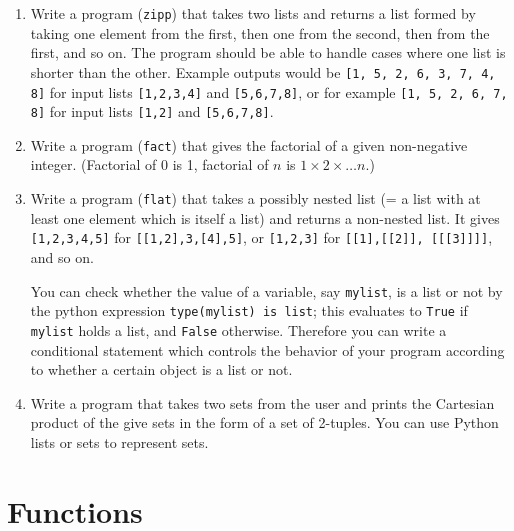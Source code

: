 \documentclass[a4paper]{article}
\begin{document}
\begin{itemize}
\begin{uexercise}
\begin{enumerate}
\item
Write a program (\Verb+zipp+) that takes two lists and returns a list formed by
taking one element from the first, then one from the second, then from the
first, and so on. The program should be able to handle cases where one list is
shorter than the other. Example outputs would be  
\Verb+[1, 5, 2, 6, 3, 7, 4, 8]+
for input lists \Verb+[1,2,3,4]+ and \Verb+[5,6,7,8]+, or for example 
\Verb+[1, 5, 2, 6, 7, 8]+ for input lists \Verb+[1,2]+ and \Verb+[5,6,7,8]+.

\item
Write a program (\Verb+fact+) that gives the factorial of a given non-negative integer.
(Factorial of 0 is 1, factorial of $n$ is $1\times 2 \times\ldots n$.)


\item
Write a program (\Verb+flat+) that takes a possibly nested list (= a list
with at least one element which is itself a list) and returns a non-nested list.
It gives \Verb+[1,2,3,4,5]+ for \Verb+[[1,2],3,[4],5]+, or \Verb+[1,2,3]+ for
\Verb+[[1],[[2]], [[[3]]]]+, and so on.   

You can check whether the value of a variable, say \Verb+mylist+, is a list or
not by the python expression \Verb+type(mylist) is list+; this evaluates to
\Verb+True+ if \Verb+mylist+ holds a list, and \Verb+False+ otherwise. Therefore
you can write a conditional statement which controls the behavior of your
program according to whether a certain object is a list or not.



\item \label{excartesian}
Write a program that takes two sets from the user and prints the Cartesian
product of the give sets in the form of a set of 2-tuples. You can use Python lists or
sets to represent sets.
\end{enumerate}
\end{uexercise}

\end{itemize}


\section{Functions}
\label{sec:functions}
\end{document}
